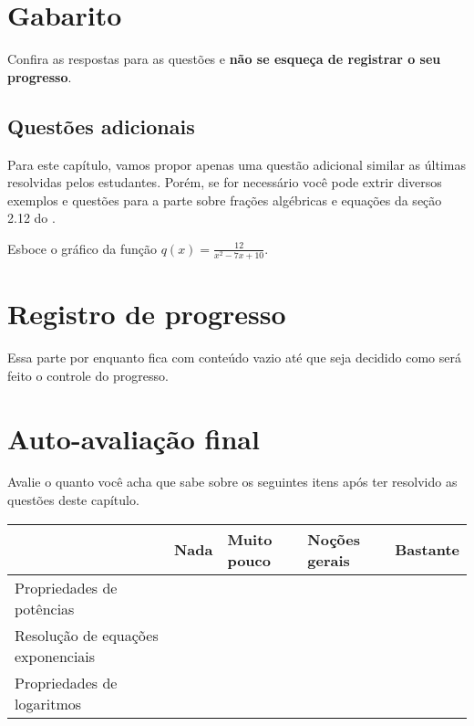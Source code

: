 \documentclass[main_estudante.tex]{subfiles}
\begin{document}
\paraAmbos

\section{Gabarito}

Confira as respostas para as questões e \textbf{não se esqueça de registrar o seu progresso}.

\imprimeGabarito

\paraTutores

\subsection{Questões adicionais}

Para este capítulo, vamos propor apenas uma questão adicional similar as últimas resolvidas pelos estudantes. Porém, se for necessário você pode extrir diversos exemplos e questões para a parte sobre frações algébricas e equações da seção 2.12 do .

\begin{adicional}
Esboce o gráfico da função $q(x)=\frac{12}{x^2-7x+10}$.
\end{adicional}

\paraFolhaAvaliacoes

\section{Registro de progresso}

Essa parte por enquanto fica com conteúdo vazio até que seja decidido como será feito o controle do progresso.

\section{Auto-avaliação final}
Avalie o quanto você acha que sabe sobre os seguintes itens após ter resolvido as questões deste capítulo.

\begin{center}
 \begin{tabular}{|p{35mm}||p{15mm}|p{15mm}|p{15mm}|p{15mm}|} 
 \hline
   & Nada & Muito pouco & Noções gerais & Bastante\\
 \hline
 Propriedades de potências &  &  &  &  \\ 
 \hline
 Resolução de equações exponenciais&  &  &  &  \\
 \hline
 Propriedades de logaritmos &  &  &  &  \\
 \hline
\end{tabular}
\end{center}
\end{document}
